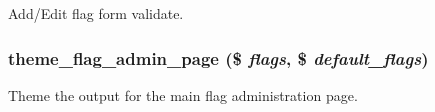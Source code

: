 Add/Edit flag form validate. \hypertarget{flag_8admin_8inc_f8043046f8852d720d2aa84b1ac3c607}{
\subsubsection[{theme\_\-flag\_\-admin\_\-page}]{\setlength{\rightskip}{0pt plus 5cm}theme\_\-flag\_\-admin\_\-page (\$ {\em flags}, \/  \$ {\em default\_\-flags})}}
\label{flag_8admin_8inc_f8043046f8852d720d2aa84b1ac3c607}


Theme the output for the main flag administration page. 